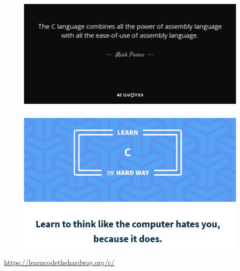\documentclass[english,14pt]{beamer}
\begin{document}

\begin{frame}[fragile]

\frametitle{}

\begin{figure}[ht]
	\centering
	\includegraphics[width=\textwidth]{figures/Cquote}
\end{figure}

\end{frame}


\begin{frame}[fragile]

\frametitle{}

\begin{figure}[ht]
	\centering
	\includegraphics[width=\textwidth]{figures/LCTHW}
\end{figure}

\href{https://learncodethehardway.org/c/}{https://learncodethehardway.org/c/}	

\end{frame}
\end{document}
